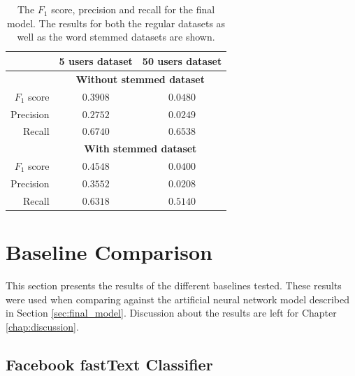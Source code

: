 \\\\
\begin{table}[h!]
    \centering
    \begin{tabular}{ r | c | c }
    & \textbf{5 users dataset} & \textbf{50 users dataset} \\ \hline    \hline
    & \multicolumn{2}{c}{\textbf{Without stemmed dataset}} \\ \hline \hline
    $F_1$ score & $0.3908$ & $0.0480$ \\ \hline
    Precision & $0.2752$ & $0.0249$ \\ \hline
    Recall & $0.6740$ & $0.6538$ \\ \hline \hline
    & \multicolumn{2}{c}{\textbf{With stemmed dataset}} \\ \hline \hline
    $F_1$ score & $0.4548$ & $0.0400$ \\ \hline
    Precision & $0.3552$ & $0.0208$ \\ \hline
    Recall & $0.6318$ & $0.5140$ \\ \hline
    \end{tabular}
    \caption{The $F_1$ score, precision and recall for the final model. The results for both the regular datasets as well as the word stemmed datasets are shown.}
    \label{table:final_all_results}
\end{table}

\section{Baseline Comparison} 
\label{sec:baseline_comp}
This section presents the results of the different baselines tested. These results were used when comparing against the artificial neural network model described in Section \ref{sec:final_model}. Discussion about the results are left for Chapter \ref{chap:discussion}.

\subsection{Facebook fastText Classifier}

